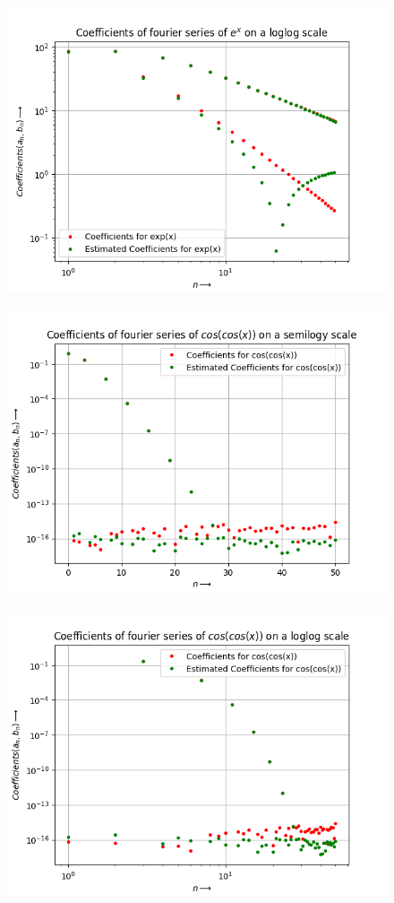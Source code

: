 \documentclass{article}
\begin{document}
\begin{figure}[h!]
    \centering
    \includegraphics[scale=0.7]{estim_coeff2.png}
    \label{fig:1(b)}
\end{figure}
\begin{figure}[h!]
    \centering
    \includegraphics[scale=0.7]{estim_coeff3.png}
    \label{fig:1(b)}
\end{figure}
\begin{figure}[h!]
    \centering
    \includegraphics[scale=0.7]{estim_coeff4.png}
    \label{fig:1(b)}
\end{figure}
\end{document}
